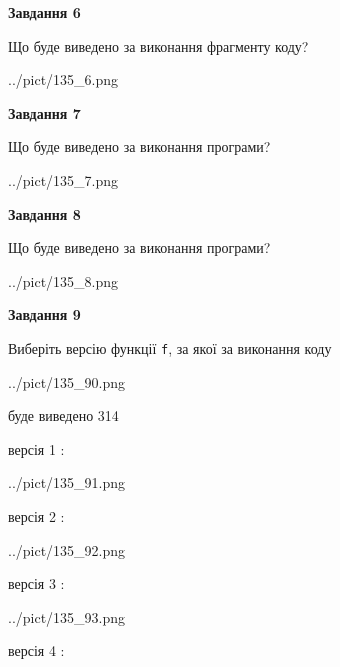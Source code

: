 \documentclass[12pt, ukrainian]{article}
\def\code#1{\Verb!#1!}
\begin{document}
{\begin {large}
{\begin {center}\textbf{Завдання 6}\end {center}}

Що буде виведено за виконання фрагменту коду?\par
\begin{center}
	{../pict/135_6.png}
\end{center}
\newpage

{\begin {center}\textbf{Завдання 7}\end {center}}

Що буде виведено за виконання програми?\par
\begin{center}
	{../pict/135_7.png}
\end{center}
\newpage

{\begin {center}\textbf{Завдання 8}\end {center}}

Що буде виведено за виконання програми?\par
\begin{center}
	{../pict/135_8.png}
\end{center}
\newpage

{\begin {center}\textbf{Завдання 9}\end {center}}

Виберіть версію функції \code{f}, за якої за виконання коду
\begin{center}
	{../pict/135_90.png}
\end{center}
буде виведено 314

\vspace{5mm}
версія 1 :

\begin{center}
	{../pict/135_91.png}
\end{center}
версія 2 :

\begin{center}
	{../pict/135_92.png}
\end{center}
версія 3 :

\begin{center}
	{../pict/135_93.png}
\end{center}
версія 4 :


\end{large}}
\end{document}

